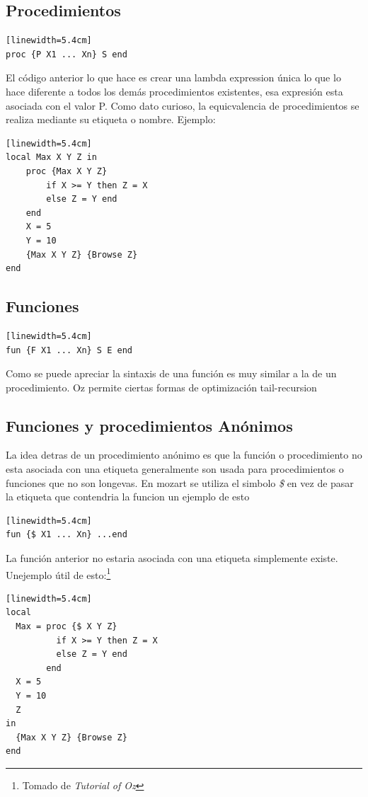 \documentclass[10pt,journal,compsoc]{IEEEtran}
\begin{document}
\subsection{Procedimientos}
\begin{lstlisting}[language=Oz, caption = {Variables en un scope}][linewidth=5.4cm]
proc {P X1 ... Xn} S end
\end{lstlisting}
El c\'odigo anterior lo que hace es crear una lambda expression \'unica lo que lo hace diferente a todos los dem\'as procedimientos existentes, esa expresi\'on esta asociada con el valor P. Como dato curioso, la equicvalencia de procedimientos se realiza mediante su etiqueta o nombre. Ejemplo:
\begin{lstlisting}[language=Oz, caption = {Obtener el mayor entre dos n\'umeros}][linewidth=5.4cm]
local Max X Y Z in 
	proc {Max X Y Z}
		if X >= Y then Z = X 
		else Z = Y end 
	end 
	X = 5
	Y = 10
	{Max X Y Z} {Browse Z}
end
\end{lstlisting}

\subsection{Funciones}
\begin{lstlisting}[language=Oz, caption = {Variables en un scope}][linewidth=5.4cm]
fun {F X1 ... Xn} S E end
\end{lstlisting}
Como se puede apreciar la sintaxis de una funci\'on es muy similar a la de un procedimiento. Oz permite ciertas formas de optimizaci\'on tail-recursion 

\subsection{Funciones y procedimientos An\'onimos}
La idea detras de un procedimiento an\'onimo es que la funci\'on o procedimiento no esta asociada con una etiqueta generalmente son usada para procedimientos o funciones que no son longevas. En mozart se utiliza el simbolo \emph{\$} en vez de pasar la etiqueta que contendria la funcion un ejemplo de esto
\begin{lstlisting}[language=Oz, caption = {Variables en un scope}][linewidth=5.4cm]
fun {$ X1 ... Xn} ...end
\end{lstlisting}
La funci\'on anterior no estaria asociada con una etiqueta simplemente existe. Unejemplo \'util de esto:\footnote{Tomado de \emph{Tutorial of Oz}}
\begin{lstlisting}[language=Oz, caption = {Variables en un scope}][linewidth=5.4cm]
local 
  Max = proc {$ X Y Z}
          if X >= Y then Z = X
          else Z = Y end 
        end 
  X = 5
  Y = 10
  Z
in 
  {Max X Y Z} {Browse Z}
end
\end{lstlisting}
\end{document}

